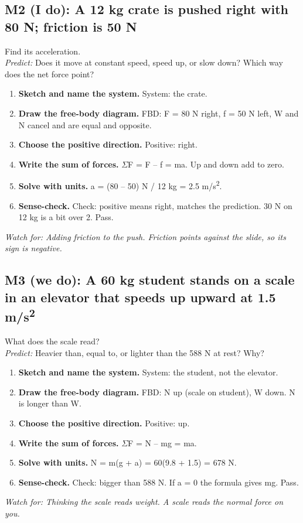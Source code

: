 \documentclass[11pt]{article}
\begin{document}
\subsection*{M2 (I do): A 12 kg crate is pushed right with 80 N; friction is 50 N}
Find its acceleration.\\ \textit{Predict:} Does it move at constant speed, speed up, or slow down? Which way does the net force point? 
\begin{enumerate}
\item \textbf{Sketch and name the system.} System: the crate.
\item \textbf{Draw the free-body diagram.} FBD: F = 80 N right, f = 50 N left, W and N cancel and are equal and opposite.
\item \textbf{Choose the positive direction.} Positive: right.
\item \textbf{Write the sum of forces.} $\Sigma$F = F -- f = ma. Up and down add to zero.
\item \textbf{Solve with units.} a = (80 -- 50) N / 12 kg = 2.5 m/s\textsuperscript{2}.
\item \textbf{Sense-check.} Check: positive means right, matches the prediction. 30 N on 12 kg is a bit over 2. Pass.
\end{enumerate}
 \quad \textit{Watch for: Adding friction to the push. Friction points against the slide, so its sign is negative.}\par
\subsection*{M3 (we do): A 60 kg student stands on a scale in an elevator that speeds up upward at 1.5 m/s\textsuperscript{2}}
What does the scale read?\\ \textit{Predict:} Heavier than, equal to, or lighter than the 588 N at rest? Why? 
\begin{enumerate}
\item \textbf{Sketch and name the system.} System: the student, not the elevator.
\item \textbf{Draw the free-body diagram.} FBD: N up (scale on student), W down. N is longer than W.
\item \textbf{Choose the positive direction.} Positive: up.
\item \textbf{Write the sum of forces.} $\Sigma$F = N -- mg = ma.
\item \textbf{Solve with units.} N = m(g + a) = 60(9.8 + 1.5) = 678 N.
\item \textbf{Sense-check.} Check: bigger than 588 N. If a = 0 the formula gives mg. Pass.
\end{enumerate}
 \quad \textit{Watch for: Thinking the scale reads weight. A scale reads the normal force on you.}\par
\end{document}
